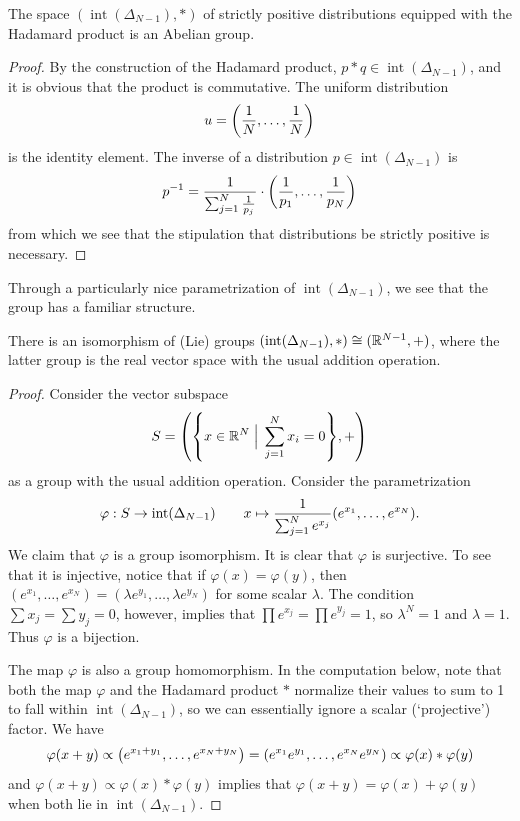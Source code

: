 \documentclass[cclicense]{hmcthesis}
\DeclareMathOperator{\intr}{int}
\numberwithin{equation}{section}
\begin{document}
    \begin{theorem}
    The space $(\intr(\Delta_{N-1}), *)$ of strictly positive distributions
    equipped with the Hadamard product is an Abelian group.
    \end{theorem}
    \begin{proof}
    By the construction of the Hadamard product, $p * q \in
    \intr(\Delta_{N-1})$, and it is obvious that the product is commutative.
    The uniform distribution
    \[
        u = \pdel*{\frac 1 N, \ldots, \frac 1 N}
    \]
    is the identity element.  The inverse of a distribution $p \in
    \intr(\Delta_{N-1})$ is 
    \[
        \inv p = \frac{1}{\sum_{j=1}^N \frac 1 {p_j}}
        \cdot\pdel*{\frac 1 {p_1}, \ldots, \frac 1 {p_N}}
    \]
    from which we see that the stipulation that distributions be strictly
    positive is necessary.
    \end{proof}

    Through a particularly nice parametrization of $\intr(\Delta_{N-1})$, we see
    that the group has a familiar structure.
    \begin{theorem} \label{thm:dist-par}
    There is an isomorphism of (Lie) groups $(\intr(\Delta_{N-1}), *) \iso
    (\R^{N-1}, +)$, where the latter group is the real vector space with the
    usual addition operation.
    \end{theorem}
    \begin{proof}
    Consider the vector subspace
    \[
        S = \pdel*{\cdel*{x \in \R^N \;\Big\vert\; \sum_{j=1}^N x_i = 0 }, +}
    \]
    as a group with the usual addition operation.  Consider the parametrization
    \[
        \varphi : S \to \intr(\Delta_{N-1})
        \qquad
        x \mapsto \frac{1}{\sum_{j=1}^N e^{x_j}} 
        \pdel*{e^{x_1}, \ldots, e^{x_N}}.
    \]
    We claim that $\varphi$ is a group isomorphism.  It is clear that $\varphi$
    is surjective.  To see that it is injective, notice that if $\varphi(x) =
    \varphi(y)$, then $(e^{x_1}, \ldots, e^{x_N}) = (\lambda e^{y_1}, \ldots,
    \lambda e^{y_N})$ for some scalar $\lambda$.  The condition $\sum x_j = \sum
    y_j = 0$, however, implies that $\prod e^{x_j} = \prod e^{y_j} = 1$, so
    $\lambda^N = 1$ and $\lambda = 1$.  Thus $\varphi$ is a bijection.

    The map $\varphi$ is also a group homomorphism.  In the computation below,
    note that both the map $\varphi$ and the Hadamard product $*$ normalize
    their values to sum to 1 to fall within $\intr(\Delta_{N-1})$, so we can
    essentially ignore a scalar (`projective') factor.  We have
    \[
        \varphi(x + y)
        \propto
        \pdel*{e^{x_1 + y_1}, \ldots, e^{x_N + y_N}}
        =
        \pdel*{e^{x_1}e^{y_1}, \ldots, e^{x_N}e^{y_N}}
        \propto
        \varphi(x) * \varphi(y)
    \]
    and $\varphi(x + y) \propto \varphi(x) * \varphi(y)$ implies that $\varphi(x
    + y) = \varphi(x) + \varphi(y)$ when both lie in $\intr(\Delta_{N-1})$.
    \end{proof}
    
\end{document}
